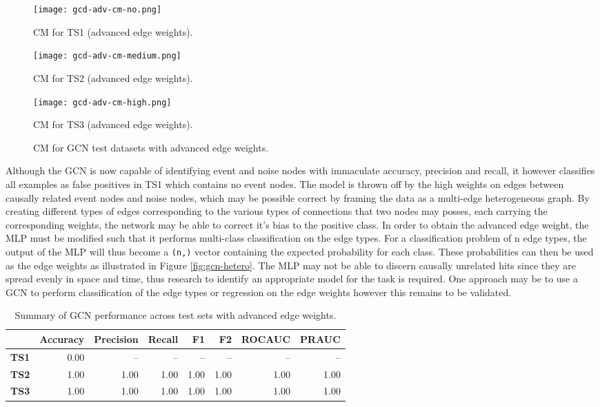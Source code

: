 \begin{figure}[htb]
  \centering
    \begin{minipage}{0.32\textwidth}
    \centering
    \texttt{[image: gcd-adv-cm-no.png]}
    \caption{CM for TS1 (advanced edge weights).}
  \end{minipage}
  \begin{minipage}{0.32\textwidth}
    \centering
    \texttt{[image: gcd-adv-cm-medium.png]}
    \caption{CM for TS2 (advanced edge weights).}
  \end{minipage}
  \begin{minipage}{0.32\textwidth}
    \centering
    \texttt{[image: gcd-adv-cm-high.png]}
    \caption{CM for TS3 (advanced edge weights).}
  \end{minipage}
  \caption{CM for GCN test datasets with advanced edge weights.}
  \label{fig:gcn-cm-adv}
\end{figure}

Although the GCN is now capable of identifying event and noise nodes
with immaculate accuracy, precision and recall, it however classifies
all examples as false positives in TS1 which contains no event nodes.
The model is thrown off by the high weights on edges between causally
related event nodes and noise nodes, which may be possible correct by
framing the data as a multi-edge heterogeneous graph. By creating
different types of edges corresponding to the various types of
connections that two nodes may posses, each carrying the corresponding
weights, the network may be able to correct it's bias to the positive
class. In order to obtain the advanced edge weight, the MLP must be
modified such that it performs multi-class classification on the edge
types. For a classification problem of n edge types, the output of the
MLP will thus become a \texttt{(n,)} vector containing the expected
probability for each class. These probabilities can then be used as
the edge weights as illustrated in Figure \ref{fig:gcn-hetero}. The
MLP may not be able to discern causally unrelated hits since they are
spread evenly in space and time, thus research to identify an
appropriate model for the task is required. One approach may be to use
a GCN to perform classification of the edge types or regression on the
edge weights \cite{gong2019exploiting} however this remains to be
validated.

\begin{table}[htb]
  \centering
  \caption{Summary of GCN performance across test sets with advanced
    edge weights.}
  \begin{tabular}{lrrrrrrr}
    \hline
    & Accuracy & Precision & Recall & F1 & F2 & ROCAUC & PRAUC \\
    \hline
    \textbf{TS1} & 0.00 & -- & -- & -- & -- & -- & -- \\
    \textbf{TS2} & 1.00 & 1.00 & 1.00 & 1.00 & 1.00 & 1.00 & 1.00 \\
    \textbf{TS3} & 1.00 & 1.00 & 1.00 & 1.00 & 1.00 & 1.00 & 1.00 \\
    \hline
  \end{tabular}
  \label{tab:gcn-results-adv}
\end{table}

